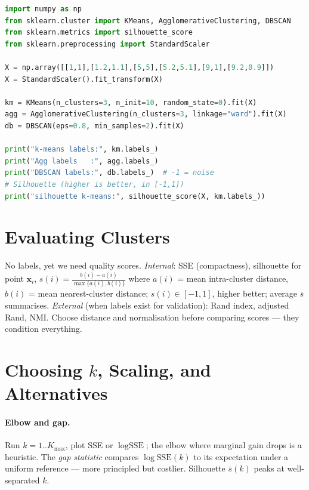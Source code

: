\begin{lstlisting}[language=Python, caption={Three clusterers compared; silhouette picks the more coherent $k$.}, label={lst:clustering}]
import numpy as np
from sklearn.cluster import KMeans, AgglomerativeClustering, DBSCAN
from sklearn.metrics import silhouette_score
from sklearn.preprocessing import StandardScaler

X = np.array([[1,1],[1.2,1.1],[5,5],[5.2,5.1],[9,1],[9.2,0.9]])
X = StandardScaler().fit_transform(X)

km = KMeans(n_clusters=3, n_init=10, random_state=0).fit(X)
agg = AgglomerativeClustering(n_clusters=3, linkage="ward").fit(X)
db = DBSCAN(eps=0.8, min_samples=2).fit(X)

print("k-means labels:", km.labels_)
print("Agg labels   :", agg.labels_)
print("DBSCAN labels:", db.labels_)  # -1 = noise
# Silhouette (higher is better, in [-1,1])
print("silhouette k-means:", silhouette_score(X, km.labels_))
\end{lstlisting}

\section{Evaluating Clusters}
\label{sec:eval-cluster}
No labels, yet we need quality scores. \emph{Internal}: SSE (compactness), silhouette for point $\mathbf{x}_i$, $s(i)=\frac{b(i)-a(i)}{\max\{a(i),b(i)\}}$ where $a(i)$ = mean intra-cluster distance, $b(i)$ = mean nearest-cluster distance; $s(i)\in[-1,1]$, higher better; average $\bar{s}$ summarises. \emph{External} (when labels exist for validation): Rand index, adjusted Rand, NMI. Choose distance and normalisation before comparing scores --- they condition everything.

\section{\texorpdfstring{Choosing $k$, Scaling, and Alternatives}{Choosing k, Scaling, and Alternatives}}
\label{sec:choose-k}
\paragraph{Elbow and gap.} Run $k=1..K_{\max}$, plot SSE or $\log\text{SSE}$; the elbow where marginal gain drops is a heuristic. The \emph{gap statistic} compares $\log\text{SSE}(k)$ to its expectation under a uniform reference --- more principled but costlier. Silhouette $\bar{s}(k)$ peaks at well-separated $k$.


